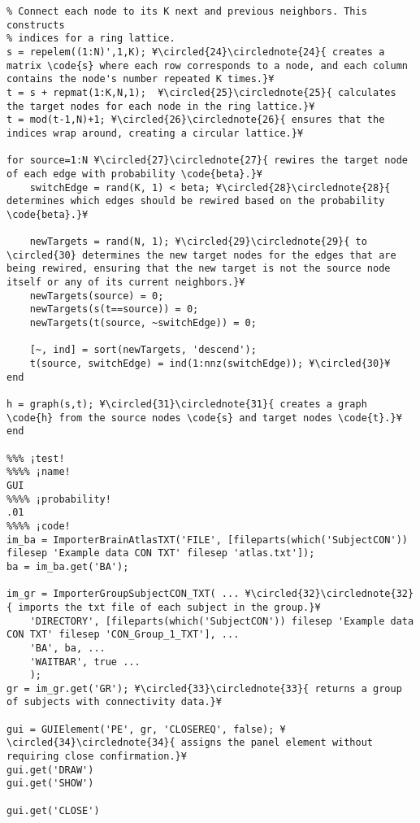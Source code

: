 \documentclass{tufte-handout}
\begin{document}
\begin{lstlisting}
% Connect each node to its K next and previous neighbors. This constructs
% indices for a ring lattice.
s = repelem((1:N)',1,K); ¥\circled{24}\circlednote{24}{ creates a matrix \code{s} where each row corresponds to a node, and each column contains the node's number repeated K times.}¥
t = s + repmat(1:K,N,1);  ¥\circled{25}\circlednote{25}{ calculates the target nodes for each node in the ring lattice.}¥
t = mod(t-1,N)+1; ¥\circled{26}\circlednote{26}{ ensures that the indices wrap around, creating a circular lattice.}¥

for source=1:N ¥\circled{27}\circlednote{27}{ rewires the target node of each edge with probability \code{beta}.}¥
    switchEdge = rand(K, 1) < beta; ¥\circled{28}\circlednote{28}{ determines which edges should be rewired based on the probability \code{beta}.}¥

    newTargets = rand(N, 1); ¥\circled{29}\circlednote{29}{ to \circled{30} determines the new target nodes for the edges that are being rewired, ensuring that the new target is not the source node itself or any of its current neighbors.}¥
    newTargets(source) = 0;
    newTargets(s(t==source)) = 0; 
    newTargets(t(source, ~switchEdge)) = 0; 
    
    [~, ind] = sort(newTargets, 'descend');
    t(source, switchEdge) = ind(1:nnz(switchEdge)); ¥\circled{30}¥
end

h = graph(s,t); ¥\circled{31}\circlednote{31}{ creates a graph \code{h} from the source nodes \code{s} and target nodes \code{t}.}¥
end

%%% ¡test!
%%%% ¡name!
GUI
%%%% ¡probability!
.01
%%%% ¡code!
im_ba = ImporterBrainAtlasTXT('FILE', [fileparts(which('SubjectCON')) filesep 'Example data CON TXT' filesep 'atlas.txt']);
ba = im_ba.get('BA');

im_gr = ImporterGroupSubjectCON_TXT( ... ¥\circled{32}\circlednote{32}{ imports the txt file of each subject in the group.}¥
    'DIRECTORY', [fileparts(which('SubjectCON')) filesep 'Example data CON TXT' filesep 'CON_Group_1_TXT'], ...
    'BA', ba, ...
    'WAITBAR', true ...
    );
gr = im_gr.get('GR'); ¥\circled{33}\circlednote{33}{ returns a group of subjects with connectivity data.}¥

gui = GUIElement('PE', gr, 'CLOSEREQ', false); ¥\circled{34}\circlednote{34}{ assigns the panel element without requiring close confirmation.}¥
gui.get('DRAW')
gui.get('SHOW')

gui.get('CLOSE')
\end{lstlisting}
\end{document}
